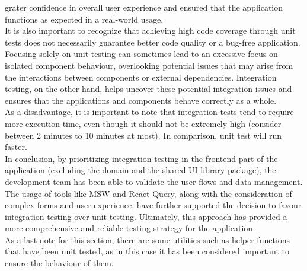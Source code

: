 \documentclass[./memory.tex]{subfiles}
\begin{document}
grater confidence in overall user experience and ensured that the application
functions as expected in a real-world usage.
\\[8pt]
It is also important to recognize that achieving high code coverage through unit
tests does not necessarily guarantee better code quality or a bug-free
application. Focusing solely on unit testing can sometimes lead to an excessive
focus on isolated component behaviour, overlooking potential issues that may
arise from the interactions between components or external dependencies.
Integration testing, on the other hand, helps uncover these potential
integration issues and ensures that the applications and components behave
correctly as a whole.
\\[8pt]
As a disadvantage, it is important to note that integration tests tend to
require more execution time, even though it should not be extremely high
(consider between 2 minutes to 10 minutes at most). In comparison, unit test
will run faster.
\\[8pt]
In conclusion, by prioritizing integration testing in the frontend part of the
application (excluding the domain and the shared UI library package), the
development team has been able to validate the user flows and data management.
The usage of tools like MSW and React Query, along with the consideration of
complex forms and user experience, have further supported the decision to favour
integration testing over unit testing. Ultimately, this approach has provided a
more comprehensive and reliable testing strategy for the application
\\[8pt]
As a last note for this section, there are some utilities such as helper
functions that have been unit tested, as in this case it has been considered
important to ensure the behaviour of them.
\end{document}

